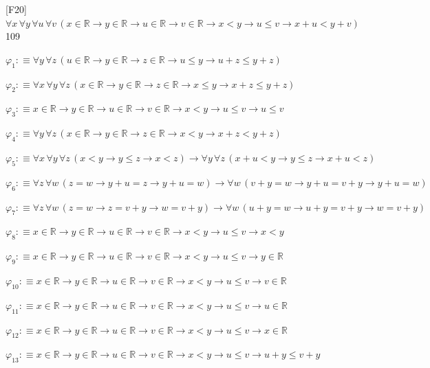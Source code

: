 \begin{fullproof}{[F20]}{$\forall x\,\forall y\,\forall u\,\forall v\,(x \in \mathbb{R} \to y \in \mathbb{R} \to u \in \mathbb{R} \to v \in \mathbb{R} \to x < y \to u \leq v \to x + u < y + v)$}{109}
\begin{ptree}
\end{ptree}
\begin{abbrevlist}
\item $\varphi_{1} :\equiv \forall y\,\forall z\,(u \in \mathbb{R} \to y \in \mathbb{R} \to z \in \mathbb{R} \to u \leq y \to u + z \leq y + z)$
\item $\varphi_{2} :\equiv \forall x\,\forall y\,\forall z\,(x \in \mathbb{R} \to y \in \mathbb{R} \to z \in \mathbb{R} \to x \leq y \to x + z \leq y + z)$
\item $\varphi_{3} :\equiv x \in \mathbb{R} \to y \in \mathbb{R} \to u \in \mathbb{R} \to v \in \mathbb{R} \to x < y \to u \leq v \to u \leq v$
\item $\varphi_{4} :\equiv \forall y\,\forall z\,(x \in \mathbb{R} \to y \in \mathbb{R} \to z \in \mathbb{R} \to x < y \to x + z < y + z)$
\item $\varphi_{5} :\equiv \forall x\,\forall y\,\forall z\,(x < y \to y \leq z \to x < z) \to \forall y\,\forall z\,(x + u < y \to y \leq z \to x + u < z)$
\item $\varphi_{6} :\equiv \forall z\,\forall w\,(z = w \to y + u = z \to y + u = w) \to \forall w\,(v + y = w \to y + u = v + y \to y + u = w)$
\item $\varphi_{7} :\equiv \forall z\,\forall w\,(z = w \to z = v + y \to w = v + y) \to \forall w\,(u + y = w \to u + y = v + y \to w = v + y)$
\item $\varphi_{8} :\equiv x \in \mathbb{R} \to y \in \mathbb{R} \to u \in \mathbb{R} \to v \in \mathbb{R} \to x < y \to u \leq v \to x < y$
\item $\varphi_{9} :\equiv x \in \mathbb{R} \to y \in \mathbb{R} \to u \in \mathbb{R} \to v \in \mathbb{R} \to x < y \to u \leq v \to y \in \mathbb{R}$
\item $\varphi_{10} :\equiv x \in \mathbb{R} \to y \in \mathbb{R} \to u \in \mathbb{R} \to v \in \mathbb{R} \to x < y \to u \leq v \to v \in \mathbb{R}$
\item $\varphi_{11} :\equiv x \in \mathbb{R} \to y \in \mathbb{R} \to u \in \mathbb{R} \to v \in \mathbb{R} \to x < y \to u \leq v \to u \in \mathbb{R}$
\item $\varphi_{12} :\equiv x \in \mathbb{R} \to y \in \mathbb{R} \to u \in \mathbb{R} \to v \in \mathbb{R} \to x < y \to u \leq v \to x \in \mathbb{R}$
\item $\varphi_{13} :\equiv x \in \mathbb{R} \to y \in \mathbb{R} \to u \in \mathbb{R} \to v \in \mathbb{R} \to x < y \to u \leq v \to u + y \leq v + y$

\end{abbrevlist}
\end{fullproof}
